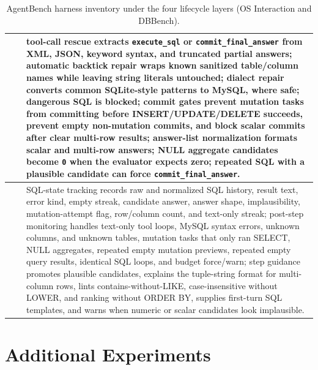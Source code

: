 \begin{table}[t]
\begin{tabular}{>{\centering\arraybackslash}m{}>{\centering\arraybackslash}m{}p{}}
\cmidrule(lr){2-3}
& \multirow{7}{*}{Action Realization Layer}
& tool-call rescue extracts \texttt{execute\_sql} or
\texttt{commit\_final\_answer} from XML, JSON, keyword syntax, and truncated
partial answers; automatic backtick repair wraps known sanitized table/column names while
leaving string literals untouched; dialect repair converts common SQLite-style
patterns to MySQL, where safe; dangerous SQL is blocked; commit gates prevent
mutation tasks from committing before INSERT/UPDATE/DELETE succeeds, prevent
empty non-mutation commits, and block scalar commits after clear multi-row
results; answer-list normalization formats scalar and multi-row answers; NULL
aggregate candidates become \texttt{0} when the evaluator expects zero; repeated
SQL with a plausible candidate can force \texttt{commit\_final\_answer}. \\
\cmidrule(lr){2-3}
& \multirow{7}{*}{Trajectory Regulation Layer}
& SQL-state tracking records raw and normalized SQL history, result text,
error kind, empty streak, candidate answer, answer shape, implausibility,
mutation-attempt flag, row/column count, and text-only streak; post-step monitoring
handles text-only tool loops, MySQL syntax errors, unknown columns, and unknown
tables, mutation tasks that only ran SELECT, NULL aggregates, repeated empty
mutation previews, repeated empty query results, identical SQL loops, and budget
force/warn; step guidance promotes plausible candidates, explains the tuple-string
format for multi-column rows, lints contains-without-LIKE, case-insensitive
without LOWER, and ranking without ORDER BY, supplies first-turn SQL templates,
and warns when numeric or scalar candidates look implausible. \\
\bottomrule
\end{tabular}
\caption{AgentBench harness inventory under the four lifecycle layers (OS Interaction and DBBench).}
\label{tab:agentbench-inventory-os-db}
\end{table}

\section{Additional Experiments}
\label{app:exp}

